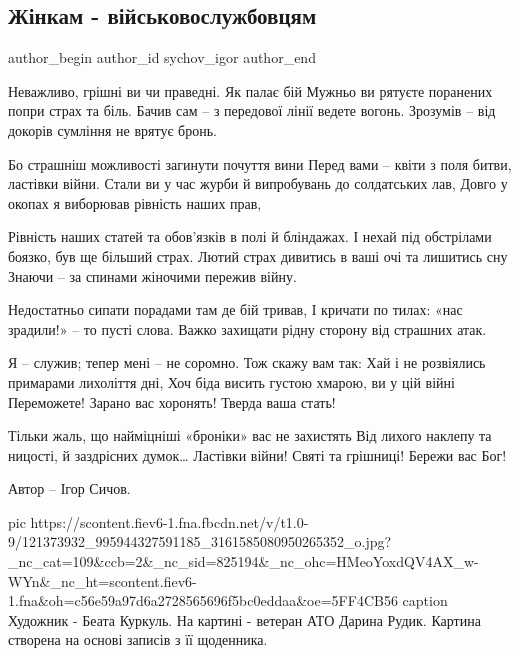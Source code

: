  
 
 
 
 

\subsection{Жінкам - військовослужбовцям}
\label{sec:14_10_2020.fb.sychov_igor.2.zhinky_vijska}

\ifcmt
  author_begin
   author_id sychov_igor
  author_end
\fi

\begin{multicols}{2}
	\obeycr
Неважливо, грішні ви чи праведні. Як палає бій
Мужньо ви рятуєте поранених попри страх та біль.
Бачив сам – з передової лінії ведете вогонь.
Зрозумів – від докорів сумління не врятує бронь.

Бо страшніш можливості загинути почуття вини
Перед вами – квіти з поля битви, ластівки війни.
Стали ви у час журби й випробувань до солдатських лав,
Довго у окопах я виборював рівність наших прав,

Рівність наших статей та обов’язків в полі й бліндажах.
І нехай під обстрілами боязко, був ще більший страх.
Лютий страх дивитись в ваші очі та лишитись сну
Знаючи – за спинами жіночими пережив війну.

Недостатньо сипати порадами там де бій тривав,
І кричати по тилах: «нас зрадили!» – то пусті слова.
Важко захищати рідну сторону від страшних атак.

Я – служив; тепер мені – не соромно. Тож скажу вам так:
Хай і не розвіялись примарами лихоліття дні,
Хоч біда висить густою хмарою, ви у цій війні
Переможете! Зарано вас хоронять! Тверда ваша стать!

Тільки жаль, що найміцніші «броніки» вас не захистять
Від лихого наклепу та ницості, й заздрісних думок…
Ластівки війни! Святі та грішниці! Бережи вас Бог!

Автор – Ігор Сичов.
	\restorecr
\end{multicols}

\ifcmt
pic https://scontent.fiev6-1.fna.fbcdn.net/v/t1.0-9/121373932_995944327591185_3161585080950265352_o.jpg?_nc_cat=109&ccb=2&_nc_sid=825194&_nc_ohc=HMeoYoxdQV4AX_w-WYn&_nc_ht=scontent.fiev6-1.fna&oh=c56e59a97d6a2728565696f5bc0eddaa&oe=5FF4CB56
caption Художник - Беата Куркуль. На картині - ветеран АТО Дарина Рудик. Картина створена на основі записів з її щоденника.
\fi
